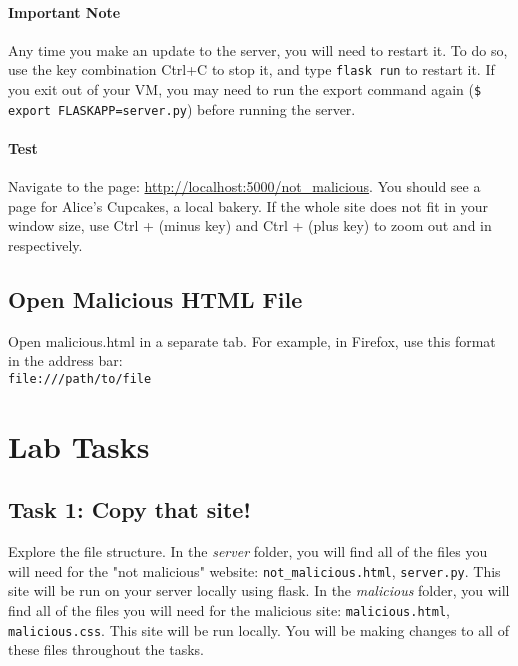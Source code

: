 \paragraph{Important Note} Any time you make an update to the server, you will need to restart it. To do so, use the  key combination Ctrl+C to stop it, and type \texttt{flask run} to restart it. If you exit out of your VM, you may need to run the export command again (\texttt{\$ export FLASKAPP=server.py}) before running the server.

\paragraph{Test} Navigate to the page: \href{http://localhost:5000/not\_malicious}{http://localhost:5000/not\_malicious}. You should see a page for Alice's Cupcakes, a local bakery. If the whole site does not fit in your window size, use Ctrl + (minus key) and Ctrl + (plus key) to zoom out and in respectively. 

\subsection{Open Malicious HTML File}

Open malicious.html in a separate tab. For example, in Firefox, use this format in the address bar:
\\\texttt{file:///path/to/file}




\section{Lab Tasks} 


\subsection{Task 1: Copy that site!}

Explore the file structure. In the \textit{server} folder, you will find all of the files you will need for the "not malicious" website: \texttt{not\_malicious.html}, \texttt{server.py}. This site will be run on your server locally using flask. In the \textit{malicious} folder, you will find all of the files you will need for the malicious site: \texttt{malicious.html}, \texttt{malicious.css}. This site will be run locally. You will be making changes to all of these files throughout the tasks. 

